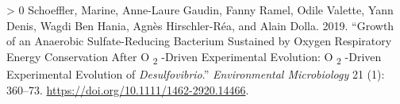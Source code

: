 \documentclass{article}
\newlength{\cslhangindent}
\newenvironment{CSLReferences}[3] %
 {%
  \setlength{\parindent}{0pt}
  \ifodd #1 \everypar{\setlength{\hangindent}{\cslhangindent}}\ignorespaces\fi
  \ifnum #2 > 0
  \setlength{\parskip}{#2\baselineskip}
  \fi
 }%
 {}
\begin{document}
\begin{CSLReferences}{1}{0}
\leavevmode\hypertarget{ref-schoeffler2019}{}%
Schoeffler, Marine, Anne-Laure Gaudin, Fanny Ramel, Odile Valette, Yann
Denis, Wagdi Ben Hania, Agnès Hirschler-Réa, and Alain Dolla. 2019.
{``Growth of an Anaerobic Sulfate-Reducing Bacterium Sustained by Oxygen
Respiratory Energy Conservation After O {\textsubscript{2}} -Driven
Experimental Evolution: O {\textsubscript{2}} -Driven Experimental
Evolution of {\emph{Desulfovibrio}}.''} \emph{Environmental
Microbiology} 21 (1): 360--73.
\url{https://doi.org/10.1111/1462-2920.14466}.

\end{CSLReferences}



\end{document}
